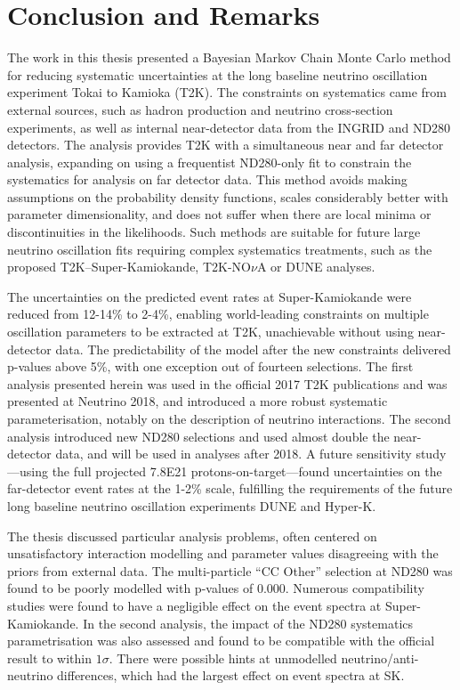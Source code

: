 \chapter{Conclusion and Remarks}
\label{chap:conclusion}
The work in this thesis presented a Bayesian Markov Chain Monte Carlo method for reducing systematic uncertainties at the long baseline neutrino oscillation experiment Tokai to Kamioka (T2K). The constraints on systematics came from external sources, such as hadron production and neutrino cross-section experiments, as well as internal near-detector data from the INGRID and ND280 detectors. The analysis provides T2K with a simultaneous near and far detector analysis, expanding on using a frequentist ND280-only fit to constrain the systematics for analysis on far detector data. This method avoids making assumptions on the probability density functions, scales considerably better with parameter dimensionality, and does not suffer when there are local minima or discontinuities in the likelihoods. Such methods are suitable for future large neutrino oscillation fits requiring complex systematics treatments, such as the proposed T2K--Super-Kamiokande, T2K-NO$\nu$A or DUNE analyses.

The uncertainties on the predicted event rates at Super-Kamiokande were reduced from 12-14\% to 2-4\%, enabling world-leading constraints on multiple oscillation parameters to be extracted at T2K, unachievable without using near-detector data. The predictability of the model after the new constraints delivered p-values above 5\%, with one exception out of fourteen selections. The first analysis presented herein was used in the official 2017 T2K publications and was presented at Neutrino 2018, and introduced a more robust systematic parameterisation, notably on the description of neutrino interactions. The second analysis introduced new ND280 selections and used almost double the near-detector data, and will be used in analyses after 2018. A future sensitivity study---using the full projected 7.8E21 protons-on-target---found uncertainties on the far-detector event rates at the 1-2\% scale, fulfilling the requirements of the future long baseline neutrino oscillation experiments DUNE and Hyper-K.

The thesis discussed particular analysis problems, often centered on unsatisfactory interaction modelling and parameter values disagreeing with the priors from external data. The multi-particle ``CC Other'' selection at ND280 was found to be poorly modelled with p-values of 0.000. Numerous compatibility studies were found to have a negligible effect on the event spectra at Super-Kamiokande. In the second analysis, the impact of the ND280 systematics parametrisation was also assessed and found to be compatible with the official result to within $1\sigma$. There were possible hints at unmodelled neutrino/anti-neutrino differences, which had the largest effect on event spectra at SK.

